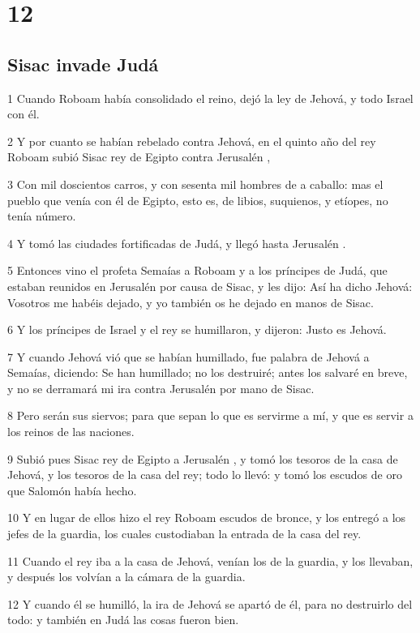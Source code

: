 \chapter{12}

\section*{Sisac invade Judá}

\par 1 Cuando Roboam había consolidado el reino, dejó la ley de Jehová, y todo Israel con él.
\par 2 Y por cuanto se habían rebelado contra Jehová, en el quinto año del rey Roboam subió Sisac rey de Egipto contra Jerusalén ,
\par 3 Con mil doscientos carros, y con sesenta mil hombres de a caballo: mas el pueblo que venía con él de Egipto, esto es, de libios, suquienos, y etíopes, no tenía número.
\par 4 Y tomó las ciudades fortificadas de Judá, y llegó hasta Jerusalén .
\par 5 Entonces vino el profeta Semaías a Roboam y a los príncipes de Judá, que estaban reunidos en Jerusalén  por causa de Sisac, y les dijo: Así ha dicho Jehová: Vosotros me habéis dejado, y yo también os he dejado en manos de Sisac.
\par 6 Y los príncipes de Israel y el rey se humillaron, y dijeron: Justo es Jehová.
\par 7 Y cuando Jehová vió que se habían humillado, fue palabra de Jehová a Semaías, diciendo: Se han humillado; no los destruiré; antes los salvaré en breve, y no se derramará mi ira contra Jerusalén por mano de Sisac.
\par 8 Pero serán sus siervos; para que sepan lo que es servirme a mí, y que es servir a los reinos de las naciones.
\par 9 Subió pues Sisac rey de Egipto a Jerusalén , y tomó los tesoros de la casa de Jehová, y los tesoros de la casa del rey; todo lo llevó: y tomó los escudos de oro que Salomón había hecho. 
\par 10 Y en lugar de ellos hizo el rey Roboam escudos de bronce, y los entregó a los jefes de la guardia, los cuales custodiaban la entrada de la casa del rey.
\par 11 Cuando el rey iba a la casa de Jehová, venían los de la guardia, y los llevaban, y después los volvían a la cámara de la guardia.
\par 12 Y cuando él se humilló, la ira de Jehová se apartó de él, para no destruirlo del todo: y también en Judá las cosas fueron bien.
